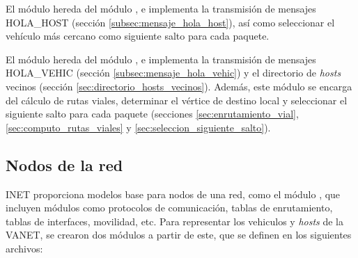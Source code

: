 \begin{sloppypar}
El módulo  hereda del módulo
, e implementa la transmisión de mensajes
\mbox{HOLA\_HOST} (sección \ref{subsec:mensaje_hola_host}), así como seleccionar
el vehículo más cercano como siguiente salto para cada paquete.
\end{sloppypar}

\begin{sloppypar}
El módulo  hereda del módulo
, e implementa la transmisión de mensajes
\mbox{HOLA\_VEHIC} (sección \ref{subsec:mensaje_hola_vehic}) y el directorio de \textit{hosts}
vecinos (sección \ref{sec:directorio_hosts_vecinos}).
Además, este módulo se encarga del cálculo de rutas viales, determinar el vértice de destino
local y seleccionar el siguiente salto para cada paquete (secciones
\ref{sec:enrutamiento_vial}, \ref{sec:computo_rutas_viales} y
\ref{sec:seleccion_siguiente_salto}).
\end{sloppypar}

\subsection{Nodos de la red}
\label{subsec:nodos_de_la_red_sim}

INET proporciona modelos base para nodos de una red, como el módulo
\href{https://doc.omnetpp.org/inet/api-current/neddoc/inet.node.inet.AdhocHost.html}{},
que incluyen módulos como protocolos de comunicación, tablas de enrutamiento,
tablas de interfaces, movilidad, etc. Para representar los vehiculos y
\textit{hosts} de la VANET, se crearon dos módulos a partir de este, que se
definen en los siguientes archivos:


